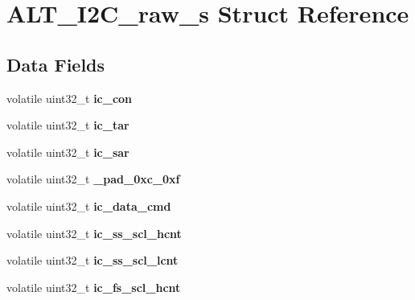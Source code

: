 \hypertarget{structALT__I2C__raw__s}{}\section{A\+L\+T\+\_\+\+I2\+C\+\_\+raw\+\_\+s Struct Reference}
\label{structALT__I2C__raw__s}
\subsection*{Data Fields}
\begin{DoxyCompactItemize}
\item 
\mbox{\label{structALT__I2C__raw__s_a9d6eb5819787169a69a0d54d396e617b}} 
volatile uint32\+\_\+t {\bfseries ic\+\_\+con}
\item 
\mbox{\label{structALT__I2C__raw__s_ab5e7ad5edebe7bfaff0e66928d55a729}} 
volatile uint32\+\_\+t {\bfseries ic\+\_\+tar}
\item 
\mbox{\label{structALT__I2C__raw__s_a5b68d8ae0b16dcd437d6d2808725f3fd}} 
volatile uint32\+\_\+t {\bfseries ic\+\_\+sar}
\item 
\mbox{\label{structALT__I2C__raw__s_a2f31520bed8e5cace916e4c9698b854d}} 
volatile uint32\+\_\+t {\bfseries \+\_\+pad\+\_\+0xc\+\_\+0xf}
\item 
\mbox{\label{structALT__I2C__raw__s_a3eb183828a86bc3a791c42b65ab5064a}} 
volatile uint32\+\_\+t {\bfseries ic\+\_\+data\+\_\+cmd}
\item 
\mbox{\label{structALT__I2C__raw__s_a11749d534507d13a4a0980a65131b036}} 
volatile uint32\+\_\+t {\bfseries ic\+\_\+ss\+\_\+scl\+\_\+hcnt}
\item 
\mbox{\label{structALT__I2C__raw__s_ad06d7a9bb3e9b025ef090da59e1e4be7}} 
volatile uint32\+\_\+t {\bfseries ic\+\_\+ss\+\_\+scl\+\_\+lcnt}
\item 
\mbox{\label{structALT__I2C__raw__s_a3a7e15c30e3d4467da28b526ce7416b3}} 
volatile uint32\+\_\+t {\bfseries ic\+\_\+fs\+\_\+scl\+\_\+hcnt}
\item 

\end{DoxyCompactItemize}

